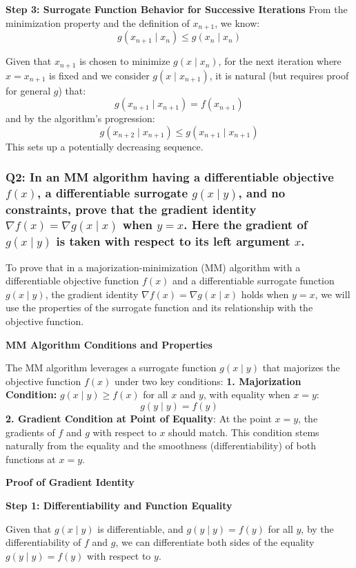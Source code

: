 \documentclass[8pt]{article}
\begin{document}
\textbf{Step 3: Surrogate Function Behavior for Successive Iterations}
From the minimization property and the definition of \(x_{n+1}\), we know:
\[
g(x_{n+1} \mid x_n) \leq g(x_n \mid x_n)
\]

Given that \(x_{n+1}\) is chosen to minimize \(g(x \mid x_n)\), for the next iteration where \(x = x_{n+1}\) is fixed and we consider \(g(x \mid x_{n+1})\), it is natural (but requires proof for general \(g\)) that:
\[
g(x_{n+1} \mid x_{n+1}) = f(x_{n+1})
\]
and by the algorithm’s progression:
\[
g(x_{n+2} \mid x_{n+1}) \leq g(x_{n+1} \mid x_{n+1})
\]
This sets up a potentially decreasing sequence.

\subsubsection*{Q2: In an MM algorithm having a differentiable objective \(f(x)\), a differentiable surrogate \(g(x \mid y)\), and no constraints, prove that the gradient identity \(\nabla f(x) = \nabla g(x \mid x)\) when \(y = x\). Here the gradient of \(g(x \mid y)\) is taken with respect to its left argument \(x\).}

To prove that in a majorization-minimization (MM) algorithm with a differentiable objective function \(f(x)\) and a differentiable surrogate function \(g(x \mid y)\), the gradient identity \(\nabla f(x) = \nabla g(x \mid x)\) holds when \(y = x\), we will use the properties of the surrogate function and its relationship with the objective function.

\textbf{MM Algorithm Conditions and Properties}

The MM algorithm leverages a surrogate function \(g(x \mid y)\) that majorizes the objective function \(f(x)\) under two key conditions:
\textbf{1. Majorization Condition:} \(g(x \mid y) \geq f(x)\) for all \(x\) and \(y\), with equality when \(x = y\):
   \[
   g(y \mid y) = f(y)
   \]
\textbf{2. Gradient Condition at Point of Equality}: At the point \(x = y\), the gradients of \(f\) and \(g\) with respect to \(x\) should match. This condition stems naturally from the equality and the smoothness (differentiability) of both functions at \(x = y\).

\textbf{Proof of Gradient Identity}

\textbf{Step 1: Differentiability and Function Equality}

Given that \(g(x \mid y)\) is differentiable, and \(g(y \mid y) = f(y)\) for all \(y\), by the differentiability of \(f\) and \(g\), we can differentiate both sides of the equality \(g(y \mid y) = f(y)\) with respect to \(y\). 
\end{document}
